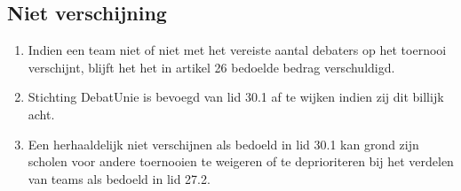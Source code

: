 \subsection{Niet verschijning}

\begin{enumerate}
\item Indien een team niet of niet met het vereiste aantal debaters op het toernooi verschijnt, blijft het het in artikel 26 bedoelde bedrag verschuldigd.
\item Stichting DebatUnie is bevoegd van lid 30.1 af te wijken indien zij dit billijk acht. 
\item Een herhaaldelijk niet verschijnen als bedoeld in lid 30.1 kan grond zijn scholen voor andere toernooien te weigeren of te deprioriteren bij het verdelen van teams als bedoeld in lid 27.2.
\end{enumerate}
